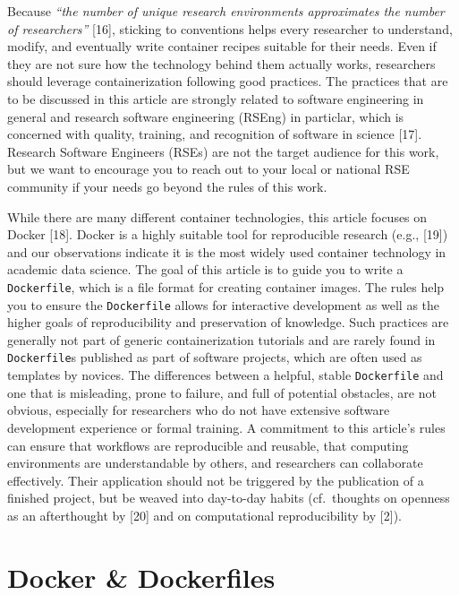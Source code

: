 \documentclass[10pt,letterpaper]{article}
\begin{document}
Because \emph{``the number of unique research environments approximates
the number of researchers''} {[}16{]}, sticking to conventions helps
every researcher to understand, modify, and eventually write container
recipes suitable for their needs. Even if they are not sure how the
technology behind them actually works, researchers should leverage
containerization following good practices. The practices that are to be
discussed in this article are strongly related to software engineering
in general and research software engineering (RSEng) in particlar, which
is concerned with quality, training, and recognition of software in
science {[}17{]}. Research Software Engineers (RSEs) are not the target
audience for this work, but we want to encourage you to reach out to
your local or national RSE community if your needs go beyond the rules
of this work.

While there are many different container technologies, this article
focuses on Docker {[}18{]}. Docker is a highly suitable tool for
reproducible research (e.g., {[}19{]}) and our observations indicate it
is the most widely used container technology in academic data science.
The goal of this article is to guide you to write a \texttt{Dockerfile},
which is a file format for creating container images. The rules help you
to ensure the \texttt{Dockerfile} allows for interactive development as
well as the higher goals of reproducibility and preservation of
knowledge. Such practices are generally not part of generic
containerization tutorials and are rarely found in \texttt{Dockerfile}s
published as part of software projects, which are often used as
templates by novices. The differences between a helpful, stable
\texttt{Dockerfile} and one that is misleading, prone to failure, and
full of potential obstacles, are not obvious, especially for researchers
who do not have extensive software development experience or formal
training. A commitment to this article's rules can ensure that workflows
are reproducible and reusable, that computing environments are
understandable by others, and researchers can collaborate effectively.
Their application should not be triggered by the publication of a
finished project, but be weaved into day-to-day habits (cf.~thoughts on
openness as an afterthought by {[}20{]} and on computational
reproducibility by {[}2{]}).

\hypertarget{docker-dockerfiles}{%
\section{Docker \& Dockerfiles}\label{docker-dockerfiles}}
\end{document}
